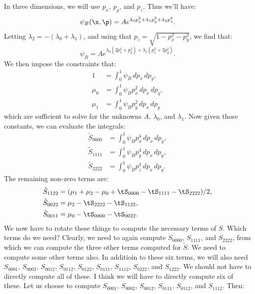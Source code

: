 \documentclass{article}
\begin{document}
In three dimensions, we will use $p_x$, $p_y$, and $p_z$. Thus we'll have:
\begin{equation}
    \psi_B(\x,\p) = A e^{\lambda_0 p_x^2 + \lambda_1 p_y^2 + \lambda_2 p_z^2}.
\end{equation}
Letting $\lambda_2 = -(\lambda_0 + \lambda_1)$, and using that $p_z=\sqrt{1-p_x^2 - p_y^2}$, we find that:
\begin{equation}
    \psi_B = A e^{\lambda_0(2p_x^2 + p_y^2) + \lambda_1(p_x^2 + 2p_y^2)}.
\end{equation}
We then impose the constraints that:
\begin{subequations}
    \begin{align}
        1       &= \int_0^1\psi_B\,dp_x\,dp_y,    \\
        \mu_0   &= \int_0^1\psi_B p_x^2\,dp_x\,dp_y,    \\
        \mu_1   &= \int_0^1\psi_B p_y^2\,dp_x\,dp_y
    \end{align}
\end{subequations}
which are sufficient to solve for the unknowns $A$, $\lambda_0$, and $\lambda_1$. Now given those constants, we can evaluate the integrals:
\begin{subequations}
    \begin{align}
        \tilde S_{0000} &= \int_0^1\psi_B p_x^4\,dp_x\,dp_y, \\
        \tilde S_{1111} &= \int_0^1\psi_B p_y^4\,dp_x\,dp_y, \\
        \tilde S_{2222} &= \int_0^1\psi_B p_z^4\,dp_x\,dp_y.
    \end{align}
\end{subequations}
The remaining non-zero terms are:
\begin{subequations}
    \begin{align}
        \tilde S_{1122} &= (\mu_1+\mu_2-\mu_0+\tS_{0000}-\tS_{1111}-\tS_{2222})/2,  \\
        \tilde S_{0022} &= \mu_2 - \tS_{2222} - \tS_{1122}, \\
        \tilde S_{0011} &= \mu_0 - \tS_{0000} - \tS_{0022}.
    \end{align}
\end{subequations}
We now have to rotate these things to compute the necessary terms of $S$.  Which terms do we need?  Clearly, we need to again compute $S_{0000}$, $S_{1111}$, and $S_{2222}$, from which we can compute the three other terms computed for $\tilde S$. We need to compute some other terms also.  In additioin to these six terms, we will also need $S_{0001}$, $S_{0002}$, $S_{0012}$, $S_{0112}$, $S_{0122}$, $S_{0111}$, $S_{1112}$, $S_{0222}$, and $S_{1222}$. We should not have to directly compute all of these. I think we will have to directly compute six of these. Let us choose to compute $S_{0001}$, $S_{0002}$, $S_{0012}$, $S_{0111}$, $S_{0112}$, and $S_{1112}$. Then:
\end{document}
